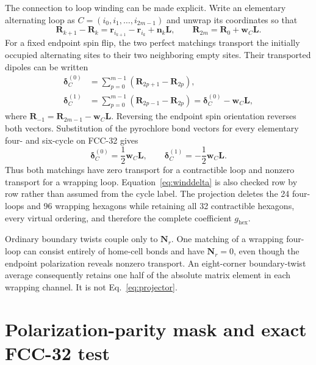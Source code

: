\documentclass[aps,prl,onecolumn,amsmath,amssymb,superscriptaddress]{revtex4-2}
\newcommand{\ghex}{g_{\mathrm{hex}}}
\newcommand{\br}{\bm r}
\newcommand{\bdelta}{\bm\delta}
\begin{document}
The connection to loop winding can be made explicit.  Write an elementary
alternating loop as
$C=(i_0,i_1,\ldots,i_{2m-1})$ and unwrap its coordinates so that
\begin{equation}
 \bm R_{k+1}-\bm R_k
 =\br_{i_{k+1}}-\br_{i_k}+\bm n_k\bm L,\qquad
 \bm R_{2m}=\bm R_0+\bm w_C\bm L .
\end{equation}
For a fixed endpoint spin flip, the two perfect matchings transport the
initially occupied alternating sites to their two neighboring empty sites.
Their transported dipoles can be written
\begin{align}
 \bdelta_C^{(0)}
 &=\sum_{p=0}^{m-1}(\bm R_{2p+1}-\bm R_{2p}),\\
 \bdelta_C^{(1)}
 &=\sum_{p=0}^{m-1}(\bm R_{2p-1}-\bm R_{2p})
 =\bdelta_C^{(0)}-\bm w_C\bm L ,
\label{eq:matchingdelta}
\end{align}
where $\bm R_{-1}=\bm R_{2m-1}-\bm w_C\bm L$.  Reversing the endpoint spin
orientation reverses both vectors.  Substitution of the pyrochlore bond
vectors for every elementary four- and six-cycle on FCC-32 gives
\begin{equation}
 \bdelta_C^{(0)}=\frac12\bm w_C\bm L,\qquad
 \bdelta_C^{(1)}=-\frac12\bm w_C\bm L .
\label{eq:winddelta}
\end{equation}
Thus both matchings have zero transport for a contractible loop and nonzero
transport for a wrapping loop.  Equation~\eqref{eq:winddelta} is also checked
row by row rather than assumed from the cycle label.  The projection deletes
the 24 four-loops and 96 wrapping hexagons while retaining all 32
contractible hexagons, every virtual ordering, and therefore the complete
coefficient $\ghex$.

Ordinary boundary twists couple only to $\bm N_r$. One matching of a
wrapping four-loop can consist entirely of home-cell bonds and have
$\bm N_r=0$, even though the endpoint polarization reveals nonzero
transport. An eight-corner boundary-twist average consequently retains one
half of the absolute matrix element in each wrapping channel. It is not
Eq.~\eqref{eq:projector}.

\section{Polarization-parity mask and exact FCC-32 test}
\label{sec:mask}
\end{document}
